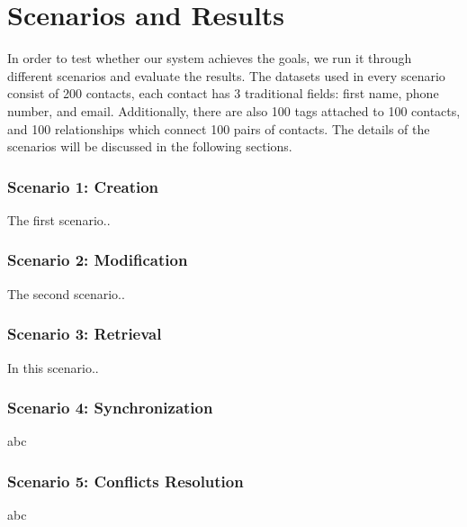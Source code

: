 
\section{Scenarios and Results}
In order to test whether our system achieves the goals, we run it through different scenarios and evaluate the results. The datasets used in every scenario consist of 200 contacts, each contact has 3 traditional fields: first name, phone number, and email. Additionally, there are also 100 tags attached to 100 contacts, and 100 relationships which connect 100 pairs of contacts. The details of the scenarios will be discussed in the following sections.

\subsubsection{Scenario 1: Creation}
The first scenario..

\subsubsection{Scenario 2: Modification}
The second scenario..

\subsubsection{Scenario 3: Retrieval}
In this scenario..

\subsubsection{Scenario 4: Synchronization}
abc

\subsubsection{Scenario 5: Conflicts Resolution}
abc

